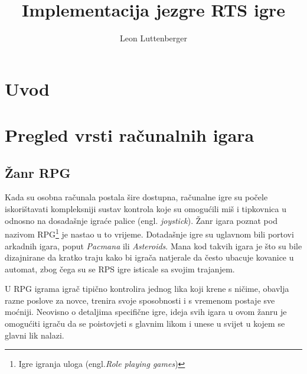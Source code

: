 \documentclass[times, utf8, zavrsni, numeric]{fer}
\begin{document}

\title{Implementacija jezgre RTS igre}

\author{Leon Luttenberger}

\maketitle

\izvornik{}

\zahvala{}

\tableofcontents

\chapter{Uvod}

\chapter{Pregled vrsti računalnih igara}\label{ch:games}


\section{Žanr RPG}

\par Kada su osobna računala postala šire dostupna, računalne igre su počele iskorištavati kompleksniji sustav kontrola koje su omogućili miš i tipkovnica u odnosno na dosadašnje igraće palice (engl. \textit{joystick}).
Žanr igara poznat pod nazivom RPG\footnote{Igre igranja uloga (engl.\textit{Role playing games})} je nastao u to vrijeme.
Dotadašnje igre su uglavnom bili portovi arkadnih igara, poput \textit{Pacmana} ili \textit{Asteroids}.
Mana kod takvih igara je što su bile dizajnirane da kratko traju kako bi igrača natjerale da često ubacuje kovanice u automat, zbog čega su se RPS igre isticale sa svojim trajanjem.

\par U RPG igrama igrač tipično kontrolira jednog lika koji krene s ničime, obavlja razne poslove za novce, trenira svoje sposobnosti i s vremenom postaje sve moćniji. 
Neovisno o detaljima specifične igre, ideja svih igara u ovom žanru je omogućiti igraču da se poistovjeti s glavnim likom i unese u svijet u kojem se glavni lik nalazi.
\end{document}
